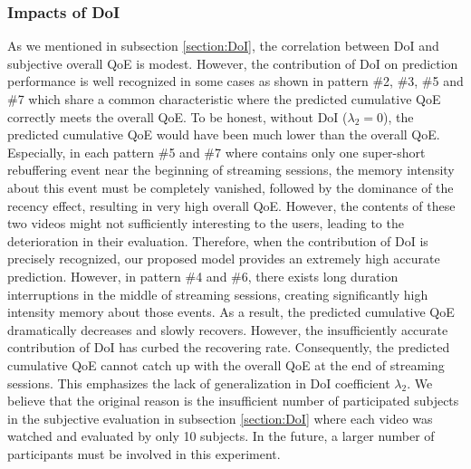 \subsubsection{Impacts of DoI}
  As we mentioned in subsection \ref{section:DoI}, the correlation between DoI and subjective overall QoE is modest. However, the contribution of DoI on prediction performance is well recognized in some cases as shown in pattern \#2, \#3, \#5 and \#7 which share a common characteristic where the predicted cumulative QoE correctly meets the overall QoE. To be honest, without DoI ($\lambda_{2}=0$), the predicted cumulative QoE would have been much lower than the overall QoE. Especially, in each pattern \#5 and \#7 where contains only one super-short rebuffering event near the beginning of streaming sessions, the memory intensity about this event must be completely vanished, followed by the dominance of the recency effect, resulting in very high overall QoE. However, the contents of these two videos might not sufficiently interesting to the users, leading to the deterioration in their evaluation. Therefore, when the contribution of DoI is precisely recognized, our proposed model provides an extremely high accurate prediction. However, in pattern \#4 and \#6, there exists long duration interruptions in the middle of streaming sessions, creating significantly high intensity memory about those events. As a result, the predicted cumulative QoE dramatically decreases and slowly recovers. However, the insufficiently accurate contribution of DoI has curbed the recovering rate. Consequently, the predicted cumulative QoE cannot catch up with the overall QoE at the end of streaming sessions. This emphasizes the lack of generalization in DoI coefficient $\lambda_{2}$. We believe that the original reason is the insufficient number of participated subjects in the subjective evaluation in subsection \ref{section:DoI} where each video was watched and evaluated by only 10 subjects. In the future, a larger number of participants must be involved in this experiment. 
  
  
